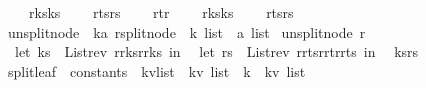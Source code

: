 \begin{isabellebody}
\ \ \ \ r{\isacharunderscore}ks{}{\isacharequal}ks{}{\isacharcomma}\isanewline
\ \ \ \ r{\isacharunderscore}ts{}{\isacharequal}rs{}{\isacharcomma}\isanewline
\ \ \ \ r{\isacharunderscore}t{\isacharequal}r{\isacharcomma}\isanewline
\ \ \ \ r{\isacharunderscore}ks{}{\isacharequal}ks{}{\isacharcomma}\isanewline
\ \ \ \ r{\isacharunderscore}ts{}{\isacharequal}rs{}\isanewline
\ \ {\isasymrparr}{\isacharparenright}{\isachardoublequoteclose}\isanewline
\isanewline
\isanewline
\isanewline
{}\isamarkupfalse%
\ unsplit{\isacharunderscore}node\ {\isacharcolon}{\isacharcolon}\ {\isachardoublequoteopen}{\isacharparenleft}{\isacharprime}k{\isacharcomma}{\isacharprime}a{\isacharparenright}\ rsplit{\isacharunderscore}node\ {\isasymRightarrow}\ {\isacharparenleft}{\isacharprime}k\ list\ {\isacharasterisk}\ {\isacharprime}a\ list{\isacharparenright}{\isachardoublequoteclose}\ \isanewline
{\isachardoublequoteopen}unsplit{\isacharunderscore}node\ r\ {\isacharequal}\ {\isacharparenleft}\isanewline
\ \ let\ ks\ {\isacharequal}\ {\isacharparenleft}List{\isachardot}rev\ {\isacharparenleft}r{\isacharbar}{\isachargreater}r{\isacharunderscore}ks{}{\isacharparenright}{\isacharparenright}{\isacharat}{\isacharparenleft}r{\isacharbar}{\isachargreater}r{\isacharunderscore}ks{}{\isacharparenright}\ in\isanewline
\ \ let\ rs\ {\isacharequal}\ {\isacharparenleft}List{\isachardot}rev\ {\isacharparenleft}r{\isacharbar}{\isachargreater}r{\isacharunderscore}ts{}{\isacharparenright}{\isacharparenright}{\isacharat}{\isacharbrackleft}r{\isacharbar}{\isachargreater}r{\isacharunderscore}t{\isacharbrackright}{\isacharat}{\isacharparenleft}r{\isacharbar}{\isachargreater}r{\isacharunderscore}ts{}{\isacharparenright}\ in\isanewline
\ \ {\isacharparenleft}ks{\isacharcomma}rs{\isacharparenright}{\isacharparenright}{\isachardoublequoteclose}\isanewline
\isanewline
\isanewline
\ \ \isanewline
\isanewline
\isanewline
\isanewline
\isanewline
\isanewline
\isanewline
\isanewline
\isanewline
\isanewline
\isanewline
\isanewline
\isanewline
\isanewline
\isanewline
\isanewline
\isanewline
\isanewline
\isanewline
{}\isamarkupfalse%
\ split{\isacharunderscore}leaf\ {\isacharcolon}{\isacharcolon}\ {\isachardoublequoteopen}constants\ {\isasymRightarrow}\ {\isacharparenleft}{\isacharprime}k{\isacharasterisk}{\isacharprime}v{\isacharparenright}list\ {\isasymRightarrow}\ {\isacharparenleft}{\isacharparenleft}{\isacharprime}k{\isacharasterisk}{\isacharprime}v{\isacharparenright}\ list\ {\isacharasterisk}\ {\isacharprime}k\ {\isacharasterisk}\ {\isacharparenleft}{\isacharprime}k{\isacharasterisk}{\isacharprime}v{\isacharparenright}\ list{\isacharparenright}{\isachardoublequoteclose}\ \isanewline

\end{isabellebody}
